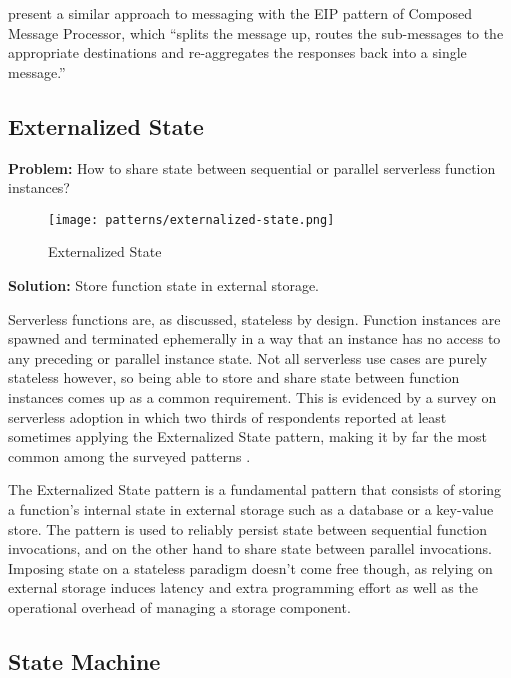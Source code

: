 \textcite{hohpe2004enterprise} present a similar approach to messaging with the EIP pattern of Composed Message Processor, which ``splits the message up, routes the sub-messages to the appropriate destinations and re-aggregates the responses back into a single message.''

\subsection{Externalized State} \label{subsec:externalizedState}

\textbf{Problem:} How to share state between sequential or parallel serverless function instances?

\begin{figure}[h]
  \centering
  \texttt{[image: patterns/externalized-state.png]}
  \caption{Externalized State}
  \label{fig:externalizedState}
\end{figure}

\textbf{Solution:} Store function state in external storage.

Serverless functions are, as discussed, stateless by design. Function instances are spawned and terminated ephemerally in a way that an instance has no access to any preceding or parallel instance state. Not all serverless use cases are purely stateless however, so being able to store and share state between function instances comes up as a common requirement. This is evidenced by a survey on serverless adoption in which two thirds of respondents reported at least sometimes applying the Externalized State pattern, making it by far the most common among the surveyed patterns \parencite{leitner18industrialpractice}.

The Externalized State pattern is a fundamental pattern that consists of storing a function's internal state in external storage such as a database or a key-value store. The pattern is used to reliably persist state between sequential function invocations, and on the other hand to share state between parallel invocations. Imposing state on a stateless paradigm doesn't come free though, as relying on external storage induces latency and extra programming effort as well as the operational overhead of managing a storage component. \parencite{leitner18industrialpractice}

\subsection{State Machine} \label{subsec:stateMachine}

